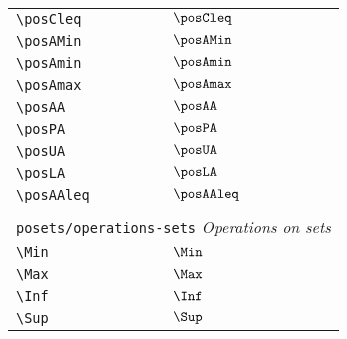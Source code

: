 \begin{longtable}{lll}
  {\color[rgb]{0.5,0.5,0.5}\texttt{\textbackslash posCleq}}                                                 & $\posCleq$                 & \\
  {\color[rgb]{0.5,0.5,0.5}\texttt{\textbackslash posAMin}}                                                 & $\posAMin$                 & \\
  {\color[rgb]{0.5,0.5,0.5}\texttt{\textbackslash posAmin}}                                                 & $\posAmin$                 & \\
  {\color[rgb]{0.5,0.5,0.5}\texttt{\textbackslash posAmax}}                                                 & $\posAmax$                 & \\
  {\color[rgb]{0.5,0.5,0.5}\texttt{\textbackslash posAA}}                                                   & $\posAA$                   & \\
  {\color[rgb]{0.5,0.5,0.5}\texttt{\textbackslash posPA}}                                                   & $\posPA$                   & \\
  {\color[rgb]{0.5,0.5,0.5}\texttt{\textbackslash posUA}}                                                   & $\posUA$                   & \\
  {\color[rgb]{0.5,0.5,0.5}\texttt{\textbackslash posLA}}                                                   & $\posLA$                   & \\
  {\color[rgb]{0.5,0.5,0.5}\texttt{\textbackslash posAAleq}}                                                & $\posAAleq$                &                                                         \\
  &                            &                                                         \\
  \multicolumn{3}{l}{{\color[rgb]{0.5,0.5,0.5}\texttt{posets/operations-sets}} \emph{Operations on sets}}
  \\
  \hline
  {\color[rgb]{0.5,0.5,0.5}\texttt{\textbackslash Min}}                                                     & $\Min$                     & \\
  {\color[rgb]{0.5,0.5,0.5}\texttt{\textbackslash Max}}                                                     & $\Max$                     & \\
  {\color[rgb]{0.5,0.5,0.5}\texttt{\textbackslash Inf}}                                                     & $\Inf$                     & \\
  {\color[rgb]{0.5,0.5,0.5}\texttt{\textbackslash Sup}}                                                     & $\Sup$                     & \\

\end{longtable}
